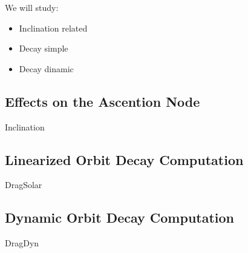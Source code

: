 
We will study:

\begin{itemize}
\item Inclination related
\item Decay simple
\item Decay dinamic
\end{itemize}

\subsection{Effects on the Ascention Node}
{Inclination}

\subsection{Linearized Orbit Decay Computation}
{DragSolar}

\subsection{Dynamic Orbit Decay Computation}
{DragDyn}


